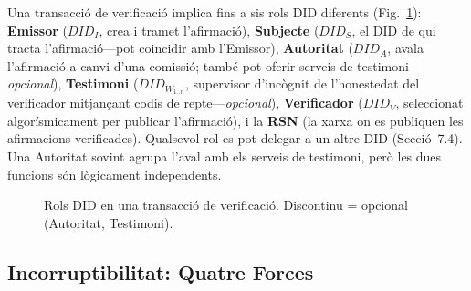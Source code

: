 \documentclass[11pt,a4paper,twocolumn]{article}
\begin{document}
Una transacció de verificació implica fins a sis rols DID diferents (Fig.~\ref{fig:roles}): \textbf{Emissor} ($DID_I$, crea i tramet l'afirmació), \textbf{Subjecte} ($DID_S$, el DID de qui tracta l'afirmació---pot coincidir amb l'Emissor), \textbf{Autoritat} ($DID_A$, avala l'afirmació a canvi d'una comissió; també pot oferir serveis de testimoni---\emph{opcional}), \textbf{Testimoni} ($DID_{W_{1..n}}$, supervisor d'incògnit de l'honestedat del verificador mitjançant codis de repte---\emph{opcional}), \textbf{Verificador} ($DID_V$, seleccionat algorísmicament per publicar l'afirmació), i la \textbf{RSN} (la xarxa on es publiquen les afirmacions verificades). Qualsevol rol es pot delegar a un altre DID (Secció~7.4). Una Autoritat sovint agrupa l'aval amb els serveis de testimoni, però les dues funcions són lògicament independents.

\begin{figure}[ht]
\centering
{}
\caption{Rols DID en una transacció de verificació. Discontinu = opcional (Autoritat, Testimoni).}
\label{fig:roles}
\end{figure}

\subsection{Incorruptibilitat: Quatre Forces}
\end{document}
